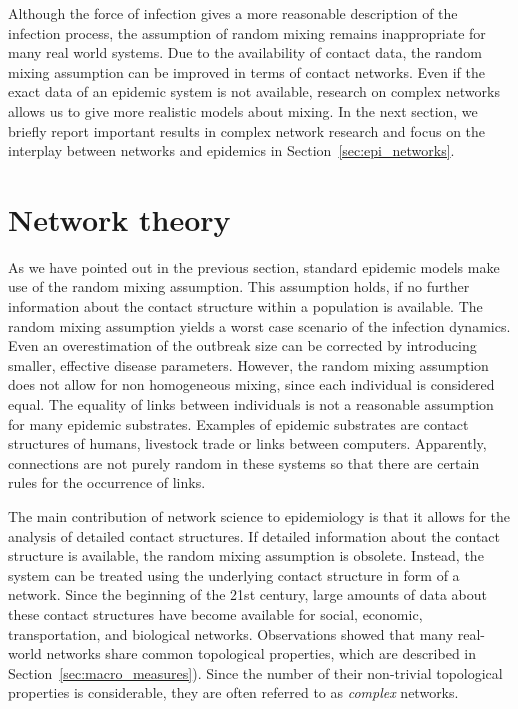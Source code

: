 Although the force of infection gives a more reasonable description of the infection process, the assumption of random mixing remains inappropriate for many real world systems.
Due to the availability of contact data, the random mixing assumption can be improved in terms of contact networks.
Even if the exact data of an epidemic system is not available, research on complex networks allows us to give more realistic models about mixing.
In the next section, we briefly report important results in complex network research and focus on the interplay between networks and epidemics in Section~\ref{sec:epi_networks}.

\section{Network theory}\label{sec:network_theory}
As we have pointed out in the previous section, standard epidemic models make use of the random mixing assumption.
This assumption holds, if no further information about the contact structure within a population is available.
The random mixing assumption yields a worst case scenario of the infection dynamics.
Even an overestimation of the outbreak size can be corrected by introducing smaller, effective disease parameters.
However, the random mixing assumption does not allow for non homogeneous mixing, since each individual is considered equal.
The equality of links between individuals is not a reasonable assumption for many epidemic substrates.
Examples of epidemic substrates are contact structures of humans, livestock trade or links between computers.
Apparently, connections are not purely random in these systems so that there are certain rules for the occurrence of links.

The main contribution of network science to epidemiology is that it allows for the analysis of detailed contact structures.
If detailed information about the contact structure is available, the random mixing assumption is obsolete.
Instead, the system can be treated using the underlying contact structure in form of a network.
Since the beginning of the 21st century, large amounts of data about these contact structures have become available for social, economic, transportation, and biological networks.
Observations showed that many real-world networks share common topological properties, which are described in Section~\ref{sec:macro_measures}).
Since the number of their non-trivial topological properties is considerable, they are often referred to as \emph{complex} networks.

